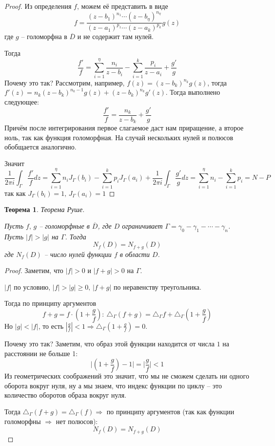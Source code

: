 \documentclass[a4paper,12pt]{article}
\renewcommand{\geq}{\ensuremath{\geqslant}}
\theoremstyle{plain}
\newtheorem{theorem}{Теорема}[section]
\theoremstyle{definition}
\theoremstyle{remark}
\begin{document}
\begin{proof}
	Из определения $f$, можем её представить в виде
	\[
		f = \frac{(z - b_1)^{n_1}\cdots(z - b_\eta)^{n_\eta}}{(z - a_1)^{p_1}\cdots(z - a_k)^{p_k}}g(z)
	\]
	где $g$ -- голоморфна в $\overline{D}$ и не содержит там нулей.

	Тогда
	\[
		\frac{f'}{f} = \sum_{i = 1}^\eta\frac{n_i}{z - b_i} - \sum_{i = 1}^k\frac{p_i}{z - a_i} + \frac{g'}{g}
	\]
	Почему это так? Рассмотрим, например, $f(z) = (z - b_k)^{n_k}g(z)$, тогда $f'(z) = n_k(z - b_k)^{n_k - 1}g(z) + (z - b_k)^{n_k}g'(z)$. Тогда выполнено следующее:
	\[
		\frac{f'}{f} = \frac{n_k}{z - b_k} + \frac{g'}{g}
	\]
	Причём после интегрирования первое слагаемое даст нам приращение, а второе ноль, так как функция голоморфная. На случай нескольких нулей и полюсов обобщается аналогично.
	
	Значит
	\[
		\frac{1}{2\pi i} \int_\Gamma\frac{f'}{f}dz = \sum_{i = 1}^\eta n_iJ_\Gamma(b_i) - \sum_{i = 1}^k p_iJ_\Gamma(a_i) + \frac{1}{2\pi i}\int_\Gamma\frac{g'}{g}dz = \sum_{i = 1}^\eta n_i - \sum_{i = 1}^k p_i = N - P
	\]
	так как $J_\Gamma(b_i) = 1,\, J_\Gamma(a_i) = 1$
\end{proof}

\begin{theorem}
	Теорема Руше.

	Пусть $f,\, g$ -- голоморфные в $\overline{D}$, где $D$ ограничивает $\Gamma = \gamma_0 - \gamma_1 - \cdots - \gamma_n$. Пусть $\vert f\vert > \vert g\vert$ на $\Gamma$. Тогда
	\[
		N_f(D) = N_{f + g}(D)
	\]
	где $N_f(D)$ -- число нулей функции $f$ в области $D$.
\end{theorem}

\begin{proof}
	Заметим, что $\vert f\vert > 0$ и $\vert f + g\vert > 0$ на $\Gamma$.

	$\vert f\vert$ по условию, $\vert f\vert > \vert g\vert \geq 0,\, \vert f + g\vert$ по неравенству треугольника.

	Тогда по принципу аргументов
	\[
		f + g = f\cdot\left(1 + \frac{g}{f}\right) :\: \triangle_\Gamma(f + g) = \triangle_\Gamma f + \triangle_\Gamma\left(1 + \frac{g}{f}\right)
	\]
	Но $\vert g\vert < \vert f\vert$, то есть $\left\vert\frac{g}{f}\right\vert < 1 \Rightarrow \triangle_\Gamma\left(1 + \frac{g}{f}\right) = 0$.

	Почему это так? Заметим, что образ этой функции находится от числа $1$ на расстоянии не больше 1:
	\[
		\vert\left(1 + \frac{g}{f}\right) - 1\vert = \vert\frac{g}{f}\vert < 1
	\]
	Из геометрических соображений это значит, что мы не сможем сделать ни одного оборота вокруг нуля, ну а мы знаем, что индекс функции по циклу -- это количество оборотов образа вокруг нуля.

	Тогда $\triangle_\Gamma(f + g) = \triangle_\Gamma(f) \Rightarrow$ по принципу аргументов (так как функции голоморфны $\Rightarrow$ нет полюсов):
	\[
		N_f(D) = N_{f +g}(D)
	\]
\end{proof}
\end{document}

